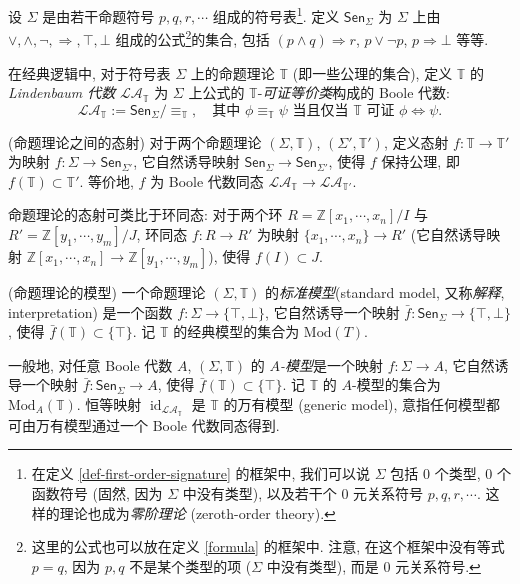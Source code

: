 设 $\Sigma$ 是由若干命题符号 $p,q,r,\cdots$ 组成的符号表\footnote{在定义 \ref{def-first-order-signature} 的框架中, 我们可以说 $\Sigma$ 包括 $0$ 个类型, $0$ 个函数符号 (固然, 因为 $\Sigma$ 中没有类型), 以及若干个 $0$ 元关系符号 $p,q,r,\cdots$. 这样的理论也成为\emph{零阶理论} (zeroth-order theory).}.
定义 $\mathsf {Sen}_\Sigma$ 为 $\Sigma$ 上由 $\lor,\land,\neg,\Rightarrow,\top,\bot$ 组成的公式\footnote{这里的公式也可以放在定义 \ref{formula} 的框架中. 注意, 在这个框架中没有等式 $p=q$, 因为 $p,q$ 不是某个类型的项 ($\Sigma$ 中没有类型), 而是 $0$ 元关系符号.}的集合, 包括 $(p\land q)\Rightarrow r$, $p\lor\neg p$, $p\Rightarrow\bot$ 等等.

\newcommand{\LA}{\mathcal {LA}}

\begin{definition}
	{}
	在经典逻辑中, 对于符号表 $\Sigma$ 上的命题理论 $\mathbb T$ (即一些公理的集合), 定义 $\mathbb T$ 的 \emph{Lindenbaum 代数} $\LA_{\mathbb T}$ 为 $\Sigma$ 上公式的 $\mathbb T$-\emph{可证等价类}构成的 Boole 代数:
	$$
	\LA_{\mathbb T} := \mathsf {Sen}_\Sigma \big/ {\equiv_{\mathbb T}},\quad
	\text{其中 $\phi\equiv_{\mathbb T} \psi$ 当且仅当 $\mathbb T$ 可证 $\phi\Leftrightarrow\psi$}.
	$$
\end{definition}

\begin{definition}
	{(命题理论之间的态射)}
	对于两个命题理论 $(\Sigma,\mathbb T)$, $(\Sigma',\mathbb T')$, 定义态射 $f\colon \mathbb T \to \mathbb T'$ 为映射 $f\colon \Sigma \to \mathsf {Sen}_{\Sigma'}$, 它自然诱导映射 $\mathsf {Sen}_\Sigma\to \mathsf {Sen}_{\Sigma'}$, 使得 $f$ 保持公理, 即 $f(\mathbb T)\subset \mathbb T'$. 等价地, $f$ 为 Boole 代数同态 $\LA_{\mathbb T} \to \LA_{\mathbb T'}$.
\end{definition}

\begin{remark}
	{}
	命题理论的态射可类比于环同态: 对于两个环 $R=\mathbb{Z}[x_1,\cdots,x_n]/I$ 与 $R'=\mathbb{Z}[y_1,\cdots,y_m]/J$, 环同态 $f\colon R\to R'$ 为映射 $\{x_1,\cdots,x_n\}\to R'$ (它自然诱导映射 $\mathbb{Z}[x_1,\cdots,x_n]\to \mathbb{Z}[y_1,\cdots,y_m]$), 使得 $f(I)\subset J$.
\end{remark}

\begin{definition}
	{(命题理论的模型)}
	一个命题理论 $(\Sigma,\mathbb T)$ 的\emph{标准模型}\footnotemark (standard model, 又称\emph{解释}, interpretation) 是一个函数 $f\colon \Sigma \to \{\top,\bot\}$, 它自然诱导一个映射 $\bar f\colon \mathsf {Sen}_\Sigma\to\{\top,\bot\}$, 使得 $\bar f(\mathbb T)\subset \{\top\}$. 记 $\mathbb T$ 的经典模型的集合为 $\text{Mod}(T)$.
	
	一般地, 对任意 Boole 代数 $A$, $(\Sigma,\mathbb T)$ 的 \emph{$A$-模型}是一个映射 $f\colon \Sigma \to A$, 它自然诱导一个映射 $\bar f\colon \mathsf {Sen}_\Sigma\to A$, 使得 $\bar f(\mathbb T)\subset \{\top\}$. 记 $\mathbb T$ 的 $A$-模型的集合为 $\text{Mod}_A(\mathbb T)$. 恒等映射 $\operatorname{id}_{\LA_{\mathbb T}}$ 是 $\mathbb T$ 的万有模型 (generic model), 意指任何模型都可由万有模型通过一个 Boole 代数同态得到.
\end{definition}


